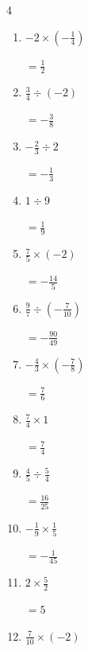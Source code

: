 \begin{multicols}{4}
\begin{enumerate}
        $\displaystyle =-\frac{9}{64}$

  \item $\displaystyle -2\times{}\left(-\frac{1}{4}\right)$

        $\displaystyle =\frac{1}{2}$

  \item $\displaystyle \frac{3}{4}\div{}\left(-2\right)$

        $\displaystyle =-\frac{3}{8}$

\columnbreak %

\resetques

  \item $\displaystyle -\frac{2}{3}\div{}2$

        $\displaystyle =-\frac{1}{3}$

  \item $\displaystyle 1\div{}9$

        $\displaystyle =\frac{1}{9}$

  \item $\displaystyle \frac{7}{5}\times{}\left(-2\right)$

        $\displaystyle =-\frac{14}{5}$

  \item $\displaystyle \frac{9}{7}\div{}\left(-\frac{7}{10}\right)$

        $\displaystyle =-\frac{90}{49}$

  \item $\displaystyle -\frac{4}{3}\times{}\left(-\frac{7}{8}\right)$

        $\displaystyle =\frac{7}{6}$

  \item $\displaystyle \frac{7}{4}\times{}1$

        $\displaystyle =\frac{7}{4}$

  \item $\displaystyle \frac{4}{5}\div{}\frac{5}{4}$

        $\displaystyle =\frac{16}{25}$

  \item $\displaystyle -\frac{1}{9}\times{}\frac{1}{5}$

        $\displaystyle =-\frac{1}{45}$

  \item $\displaystyle 2\times{}\frac{5}{2}$

        $\displaystyle =5$

  \item $\displaystyle \frac{7}{10}\times{}\left(-2\right)$


\end{enumerate}
\end{multicols}
